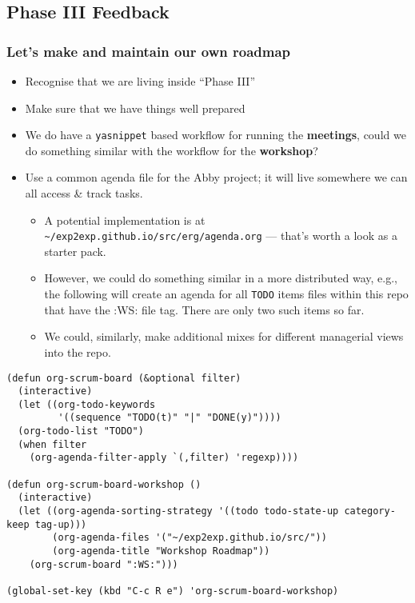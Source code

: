 \documentclass{article}
\begin{document}
\subsection{Phase III Feedback}

\subsubsection{Let’s make and maintain our own roadmap}

\begin{itemize}
\item Recognise that we are living inside ``Phase III''
\item Make sure that we have things well prepared
\item We do have a \texttt{yasnippet} based workflow for running the \textbf{meetings}, could we do something similar with the workflow for the \textbf{workshop}?
\item Use a common agenda file for the Abby project; it will live somewhere we can all access \& track tasks.
\begin{itemize}
\item A potential implementation is at \texttt{\textasciitilde{}/exp2exp.github.io/src/erg/agenda.org} — that’s worth a look as a starter pack.
\item However, we could do something similar in a more distributed way, e.g., the following will create an agenda for all \texttt{TODO} items files within this repo that have the :WS: file tag.  There are only two such items so far.
\item We could, similarly, make additional mixes for different managerial views into the repo.
\end{itemize}
\end{itemize}

\begin{verbatim}
(defun org-scrum-board (&optional filter)
  (interactive)
  (let ((org-todo-keywords
         '((sequence "TODO(t)" "|" "DONE(y)"))))
  (org-todo-list "TODO")
  (when filter
    (org-agenda-filter-apply `(,filter) 'regexp))))

(defun org-scrum-board-workshop ()
  (interactive)
  (let ((org-agenda-sorting-strategy '((todo todo-state-up category-keep tag-up)))
        (org-agenda-files '("~/exp2exp.github.io/src/"))
        (org-agenda-title "Workshop Roadmap"))
    (org-scrum-board ":WS:")))

(global-set-key (kbd "C-c R e") 'org-scrum-board-workshop)
\end{verbatim}
\end{document}
